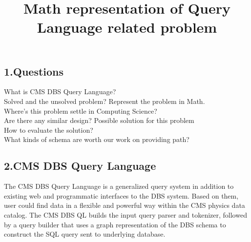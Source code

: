 \textheight 215mm
\textwidth 145mm

\oddsidemargin 0pt
\evensidemargin 0pt
\topmargin 0pt
\title{Math representation of Query Language related problem}
\maketitle
\vspace{0.5cm}
\begin{center}
{\section*{{\normalsize\bf 1.Questions}}}
\end{center}
\setcounter{section}{1}
What is CMS DBS Query Language?\\
Solved and the unsolved problem? Represent the problem in Math.\\
Where's this problem settle in Computing Science? \\
Are there any similar design? Possible solution for this problem\\
How to evaluate the solution?\\
What kinds of schema are worth our work on providing path?
\begin{center}
{\section*{{\normalsize\bf 2.CMS DBS Query Language}}}
\end{center}
\setcounter{section}{2}
The CMS DBS Query Language is a generalized query system in addition to existing web and programmatic interfaces to the DBS system. Based on them, user could find data in a flexible and powerful way within the CMS physics data catalog. The CMS DBS QL builds the input query parser and tokenizer, followed by a query builder that uses a graph representation of the DBS schema to construct the SQL query sent to underlying database.

